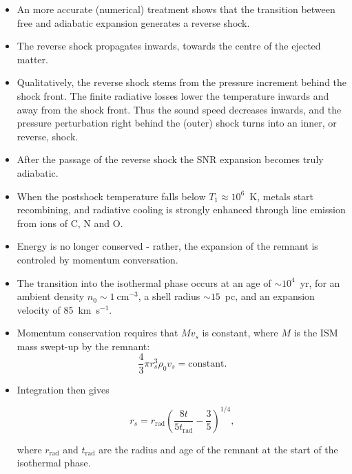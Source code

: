 
\begin{itemize}

\item An more accurate (numerical) treatment shows that the transition
  between free and adiabatic expansion generates a reverse shock.

\item The reverse shock propagates inwards, towards the centre of the
  ejected matter.

\item Qualitatively, the reverse shock stems from the pressure
  increment behind the shock front. The finite radiative losses lower
  the temperature inwards and away from the shock front. Thus the
  sound speed decreases inwards, and the pressure perturbation right
  behind the (outer) shock turns into an inner, or reverse, shock.

\item After the passage of the reverse shock the SNR expansion becomes
  truly adiabatic.
\end{itemize}


\begin{itemize}
\item When the postshock temperature falls below $T_1 \approx 10^6$~K,
  metals start recombining, and radiative cooling is strongly enhanced
  through line emission from ions of C, N and O.

\item Energy is no longer conserved - rather, the expansion of the
  remnant is controled by momentum conversation.

\item The transition into the isothermal phase occurs at an age of
  $\sim 10^{4}$~yr, for an ambient density $n_0 \sim 1~$cm$^{-3}$, a
  shell radius $\sim 15$~pc, and an expansion velocity of
  85~km~s$^{-1}$. 
\end{itemize}



\begin{itemize}
\item Momentum conservation requires that $M v_s$ is constant, where
  $M$ is the ISM mass swept-up by the remnant:
\[ \frac{4}{3} \pi r_s^3 \rho_0 v_s = \mathrm{constant}. \]

\item Integration then gives

\[ r_s = r_\mathrm{rad} \left( \frac{8 t }{5 t_\mathrm{rad}} -
\frac{3}{5} \right)^{1/4}, \] 

where $r_\mathrm{rad}$ and $t_\mathrm{rad}$ are the radius and age of
the remnant at the start of the isothermal phase. 

\end{itemize}

